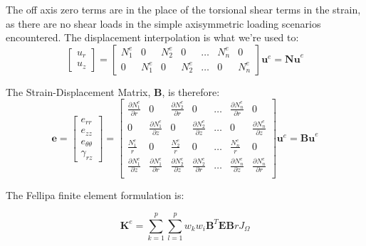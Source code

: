 \documentclass[10pt,letterpaper]{report}
\numberwithin{equation}{chapter}
\begin{document}
The off axis zero terms are in the place of the torsional shear terms in the strain, as there are no shear loads in the simple axisymmetric loading scenarios encountered.  The displacement interpolation is what we're used to:
\begin{equation}
\left[  \begin{array}{c}
u_r \\ u_z
\end{array} \right]
=
\left[  \begin{array}{ccccccc}
N^e_1 & 0 & N^e_2 & 0 & \dots & N^e_n & 0 \\
0 & N^e_1 & 0 & N^e_2 & \dots & 0 & N^e_n
\end{array} \right] 
\boldsymbol{u}^e = \boldsymbol{Nu}^e
\end{equation}

The Strain-Displacement Matrix, $\boldsymbol{B}$, is therefore:
\begin{equation}
\boldsymbol{e} =
\left[ \begin{array}{c} e_{rr} \\ e_{zz} \\ e_{\theta \theta} \\ \gamma_{rz} \end{array} \right] = 
\left[  \begin{array}{ccccccc}
\frac{\partial N^e_1}{\partial r} & 0 & \frac{\partial N^e_2}{\partial r} & 0 & \dots & \frac{\partial N^e_n}{\partial r} & 0 \\
0 & \frac{\partial N^e_1}{\partial z} & 0 & \frac{\partial N^e_2}{\partial z} & \dots & 0 & \frac{\partial N^e_n}{\partial z} \\
\frac{ N^e_1}{ r} & 0 & \frac{ N^e_2}{ r} & 0 & \dots & \frac{ N^e_n}{ r} & 0 \\
\frac{\partial N^e_1}{\partial z} & \frac{\partial N^e_1}{\partial r} & \frac{\partial N^e_2}{\partial z} & \frac{\partial N^e_2}{\partial r} & \dots & \frac{\partial N^e_n}{\partial z} &\frac{\partial N^e_n}{\partial r} \\
\end{array} \right] 
\boldsymbol{u}^e = \boldsymbol{Bu}^e
\end{equation}




The Fellipa finite element formulation is:

\begin{equation}
\boldsymbol{K}^e=\sum_{k=1}^p \sum_{l=1}^p w_k w_i \boldsymbol{B}^T \boldsymbol{E} \boldsymbol{B} r J_\Omega
\end{equation}
\end{document}
